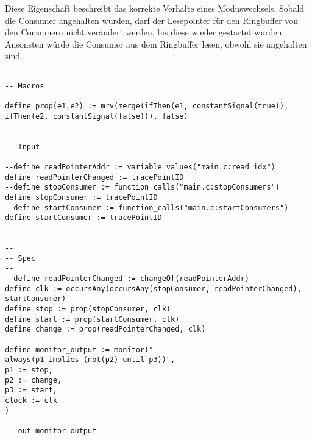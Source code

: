 \documentclass{article}
\begin{document}
Diese Eigenschaft beschreibt das korrekte Verhalte eines Moduswechsels. Sobald die Consumer angehalten wurden, darf der Lesepointer für den Ringbuffer von den Consumern nicht verändert werden, bis diese wieder gestartet wurden. Ansonsten würde die Consumer aus dem Ringbuffer lesen, obwohl sie angehalten sind.

\begin{lstlisting}[language=tessla+salt]
--
-- Macros
--
define prop(e1,e2) := mrv(merge(ifThen(e1, constantSignal(true)), ifThen(e2, constantSignal(false))), false)

--
-- Input
--
--define readPointerAddr := variable_values("main.c:read_idx")
define readPointerChanged := tracePointID
--define stopConsumer := function_calls("main.c:stopConsumers")
define stopConsumer := tracePointID
--define startConsumer := function_calls("main.c:startConsumers")
define startConsumer := tracePointID


--
-- Spec
--
--define readPointerChanged := changeOf(readPointerAddr)
define clk := occursAny(occursAny(stopConsumer, readPointerChanged), startConsumer)
define stop := prop(stopConsumer, clk)
define start := prop(startConsumer, clk)
define change := prop(readPointerChanged, clk)

define monitor_output := monitor("
always(p1 implies (not(p2) until p3))",
p1 := stop,
p2 := change,
p3 := start,
clock := clk
)

-- out monitor_output
\end{lstlisting}
\end{document}
